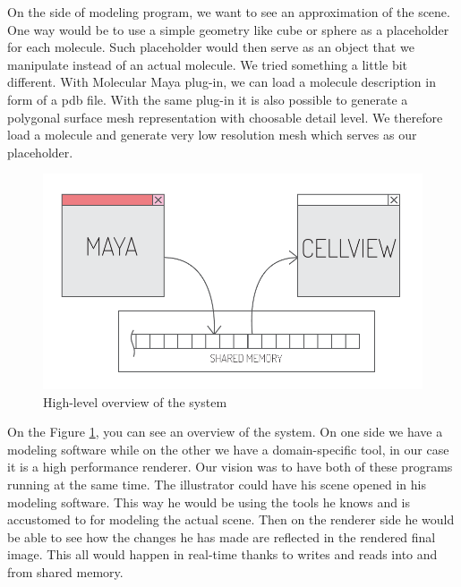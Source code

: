 \documentclass[
  digital, %
  table,   %
  nolof,     %
  nolot,     %
]{fithesis3}
\begin{document}
On the side of modeling program, we want to see an approximation of the scene. One way would be to use a simple geometry like cube or sphere as a placeholder for each molecule. Such placeholder would then serve as an object that we manipulate instead of an actual molecule. We tried something a little bit different. With Molecular Maya plug-in, we can load a molecule description in form of a pdb file. With the same plug-in it is also possible to generate a polygonal surface mesh representation with choosable detail level. We therefore load a molecule and generate very low resolution mesh which serves as our placeholder.

\begin{figure}
  \centering
  \includegraphics[scale=0.7]{images/method-overview.pdf}
  \caption{High-level overview of the system}
  \label{fig:method-overview}
\end{figure}

On the Figure \ref{fig:method-overview}, you can see an overview of the system. On one side we have a modeling software while on the other we have a domain-specific tool, in our case it is a high performance renderer. Our vision was to have both of these programs running at the same time. The illustrator could have his scene opened in his modeling software. This way he would be using the tools he knows and is accustomed to for modeling the actual scene. Then on the renderer side he would be able to see how the changes he has made are reflected in the rendered final image. This all would happen in real-time thanks to writes and reads into and from shared memory.
\end{document}
